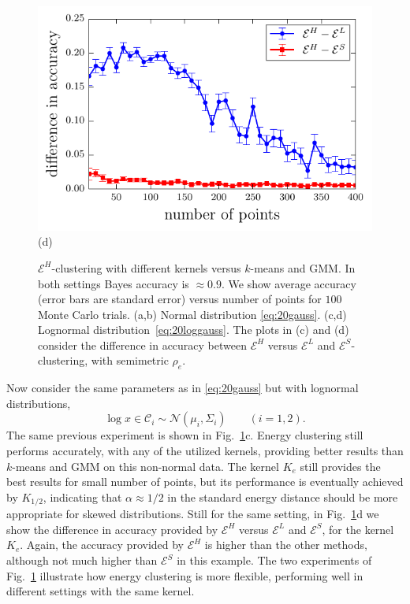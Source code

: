 \documentclass[aps,preprint,nofootinbib,floatfix]{revtex4-1}
\newcommand\kk{K}
\newcommand\C{{\mathcal{C}}}
\begin{document}
\begin{figure}
\begin{minipage}{0.49\textwidth}
\end{minipage}
\begin{minipage}{0.49\textwidth}
\centering
\includegraphics[width=1\textwidth]{lognormal_kernels_difference.pdf}\\[-1.0em]
(d)
\end{minipage}
\caption{
\label{fig:consist}
$\mathcal{E}^H$-clustering with different kernels versus
$k$-means and GMM. In both settings Bayes accuracy
is $\approx 0.9$. We show average accuracy (error bars are standard error)
versus number of points for $100$ Monte Carlo trials.
(a,b) Normal distribution \eqref{eq:20gauss}. 
(c,d) Lognormal distribution~\eqref{eq:20loggauss}.
The plots in (c) and (d) consider the difference in accuracy
between $\mathcal{E}^H$ versus $\mathcal{E}^L$ and
$\mathcal{E}^S$-clustering, with semimetric $\rho_e$.
}
\end{figure}

Now consider the same parameters as in \eqref{eq:20gauss} but with
lognormal distributions, 
\begin{equation}
\label{eq:20loggauss}
\log x \in \C_i \sim \mathcal{N}(\mu_i, \Sigma_i) \qquad (i=1,2).
\end{equation}
The same previous experiment is shown in 
Fig.~\ref{fig:consist}c.
Energy clustering still performs accurately, with any of the utilized
kernels, providing better results than $k$-means and GMM on
this non-normal data. The kernel $\kk_e$ still provides the best results
for small number of points, but its performance is eventually achieved by
$\kk_{1/2}$, indicating that $\alpha \approx 1/2$ in the standard
energy distance should be more appropriate for skewed distributions.
Still for the same setting, in Fig.~\ref{fig:consist}d
we show the difference in accuracy provided by $\mathcal{E}^H$ versus
$\mathcal{E}^L$ and $\mathcal{E}^S$, for the kernel $\kk_e$. Again,
the accuracy provided by $\mathcal{E}^H$ is higher than the other methods,
although not much higher than $\mathcal{E}^S$ in this example.
The two experiments of Fig.~\ref{fig:consist}
illustrate how energy clustering is more flexible,
performing well in different settings
with the same kernel. 
\end{document}
